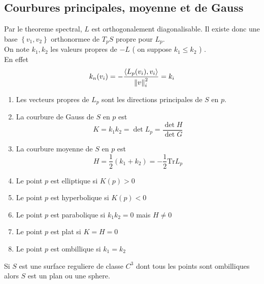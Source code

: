 \documentclass[../main.tex]{subfiles}
\begin{document}
\subsection{Courbures principales, moyenne et de Gauss}
Par le theoreme spectral, $L$ est orthogonalement diagonalisable.
Il existe donc une base $ \left\{ v_1,v_2 \right\} $ orthonormee de $T_p S$ propre pour $L_p$.\\
On note $k_1, k_2$ les valeurs propres de $-L$ ( on suppose $k_1 \leq k_2$ ) .\\
En effet
\[ 
k_n ( v_i) = - \frac{\left\langle L_p( v_i), v_i\right\rangle }{\left\lVert v\right\rVert_i ^{2}}= k_i
\]
\begin{defn}
	\begin{enumerate}
	\item Les vecteurs propres de $L_p$ sont les directions principales de $S$ en $p$.
	\item La courbure de Gauss de $S$ en $p$ est 
		\[ 
		K= k_1k_2= \det L_p = \frac{\det H}{\det G}
		\]
		
	\item La courbure moyenne de $S$ en $p$ est 
		\[ 
		H = \frac{1}{2} ( k_1+k_2) = -\frac{1}{2}\mathrm{Tr} L_p
		\]

	\item Le point $p$ est elliptique si $K( p) >0$ 
	\item Le point $p$ est hyperbolique si $K( p) <0$ 
	\item Le point $p$ est parabolique si $k_1k_2= 0$ mais $ H\neq 0$ 	
	\item Le point $p$ est plat si $K= H = 0$
	\item Le point $p$ est ombillique si $ k_1= k_2$ 
		
	\end{enumerate}
			
\end{defn}
\begin{thm}
	Si $S$ est une surface reguliere de classe $C^{3}$ dont tous les points sont ombilliques alors $S$ est un plan ou une sphere.
\end{thm}
	



	
\end{document}
